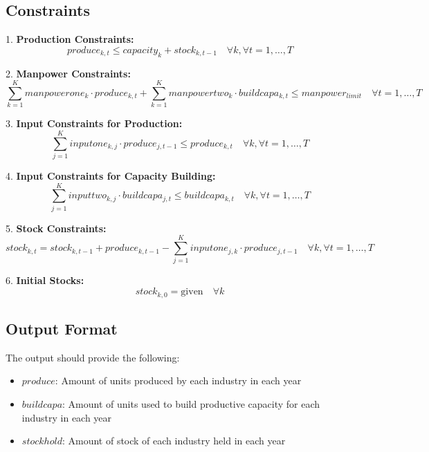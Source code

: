 \documentclass{article}
\begin{document}
\subsection*{Constraints}

1. \textbf{Production Constraints:}
   \[
   produce_{k, t} \leq capacity_{k} + stock_{k, t-1} \quad \forall k, \forall t = 1, \ldots, T
   \]

2. \textbf{Manpower Constraints:}
   \[
   \sum_{k=1}^{K} manpowerone_{k} \cdot produce_{k, t} + \sum_{k=1}^{K} manpowertwo_{k} \cdot buildcapa_{k, t} \leq manpower_{limit} \quad \forall t = 1, \ldots, T
   \]

3. \textbf{Input Constraints for Production:}
   \[
   \sum_{j=1}^{K} inputone_{k, j} \cdot produce_{j, t-1} \leq produce_{k, t} \quad \forall k, \forall t = 1, \ldots, T
   \]

4. \textbf{Input Constraints for Capacity Building:}
   \[
   \sum_{j=1}^{K} inputtwo_{k, j} \cdot buildcapa_{j, t} \leq buildcapa_{k, t} \quad \forall k, \forall t = 1, \ldots, T
   \]

5. \textbf{Stock Constraints:}
   \[
   stock_{k, t} = stock_{k, t-1} + produce_{k, t-1} - \sum_{j=1}^{K} inputone_{j, k} \cdot produce_{j, t-1} \quad \forall k, \forall t = 1, \ldots, T
   \]

6. \textbf{Initial Stocks:}
   \[
   stock_{k, 0} = \text{given} \quad \forall k
   \]

\subsection*{Output Format}
The output should provide the following:
\begin{itemize}
    \item $produce$: Amount of units produced by each industry in each year
    \item $buildcapa$: Amount of units used to build productive capacity for each industry in each year
    \item $stockhold$: Amount of stock of each industry held in each year
\end{itemize}
\end{document}
